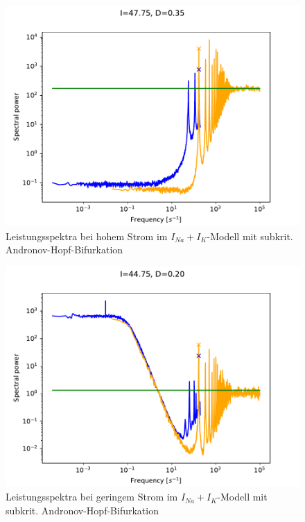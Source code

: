 \documentclass[12pt,a4paper]{article}
\begin{document}
\begin{figure}[H]
	\centering
	\includegraphics[scale=1]{twofoud35i4775os.pdf}\caption{Leistungsspektra bei hohem Strom im $I_{Na}+I_K$-Modell mit subkrit. Andronov-Hopf-Bifurkation}
	\label{twofoud35large}
\end{figure}
\begin{figure}[H]
	\centering
	\includegraphics[scale=1]{twofoud20i4475ws.pdf}\caption{Leistungsspektra bei geringem Strom im $I_{Na}+I_K$-Modell mit subkrit. Andronov-Hopf-Bifurkation}
	\label{twofoud20small}
\end{figure}
\end{document}
